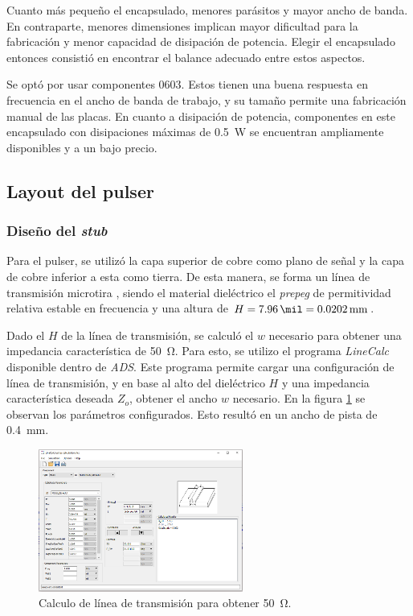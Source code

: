 Cuanto más pequeño el encapsulado, menores parásitos y mayor ancho de banda. En
contraparte, menores dimensiones implican mayor dificultad para la fabricación y
menor capacidad de disipación de potencia. Elegir el encapsulado entonces
consistió en encontrar el balance adecuado entre estos aspectos.

Se optó por usar componentes 0603. Estos tienen una buena respuesta en
frecuencia en el ancho de banda de trabajo, y su tamaño permite una fabricación
manual de las placas. En cuanto a disipación de potencia, componentes en este
encapsulado con disipaciones máximas de \qty{0.5}{\watt} se encuentran
ampliamente disponibles y a un bajo precio.

\subsection{Layout del pulser}

\subsubsection{Diseño del \textit{stub}}

Para el pulser, se utilizó la capa superior de cobre como plano de señal y la
capa de cobre inferior a esta como tierra. De esta manera, se forma un línea de
transmisión microtira \cite{pozar2011}, siendo el material dieléctrico el
\textit{prepeg} de permitividad relativa estable en frecuencia y una altura de
$H = \qty{7.96}{\mil} = \qty{0.0202}{\milli\meter}$.

Dado el $H$ de la línea de transmisión, se calculó el $w$ necesario para obtener
una impedancia característica de \qty{50}{\ohm}. Para esto, se utilizo el
programa \textit{LineCalc} disponible dentro de \textit{ADS}. Este programa
permite cargar una configuración de línea de transmisión, y en base al alto del
dieléctrico $H$ y una impedancia característica deseada $Z_o$, obtener el ancho
$w$ necesario. En la figura \ref{fig:tline_width_calculation} se observan los
parámetros configurados. Esto resultó en un ancho de pista de
\qty{0.4}{\milli\meter}.

\begin{figure}[tbp]
    \centering
    \includegraphics[width=0.6\textwidth]{images/tline_width_calculation.png}
    \caption{Calculo de línea de transmisión para obtener \qty{50}{\ohm}.}
    \label{fig:tline_width_calculation}
\end{figure}

